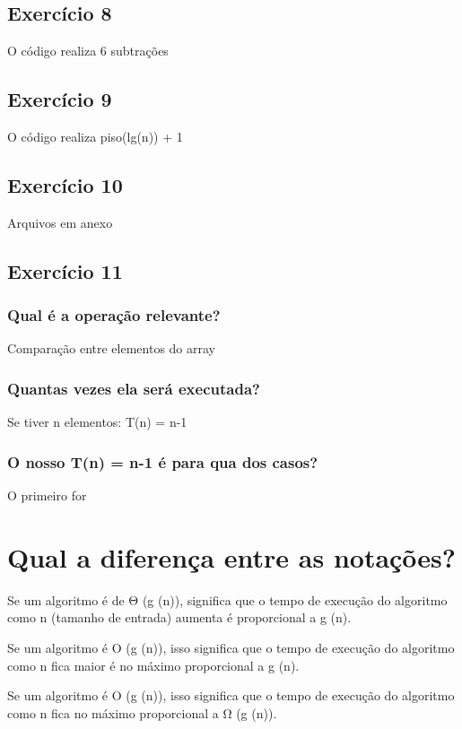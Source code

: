 \documentclass[12pt]{article}
\begin{document}
\subsection{Exercício 8}
O código realiza 6 subtrações
\subsection{Exercício 9}
O código realiza piso(lg(n)) + 1
\subsection{Exercício 10}
Arquivos em anexo
\subsection{Exercício 11}
\subsubsection{Qual é a operação relevante?}
Comparação entre elementos do array
\subsubsection{Quantas vezes ela será executada?}
Se tiver n elementos: T(n) = n-1
\subsubsection{O nosso T(n) = n-1 é para qua dos casos?}
O primeiro for

\section{Qual a diferença entre as notações?}
Se um algoritmo é de Θ (g (n)), significa que o tempo de execução do algoritmo como n 
(tamanho de entrada) aumenta é proporcional a g (n).
\par Se um algoritmo é O (g (n)), isso significa que o tempo de execução do algoritmo como n fica maior é
 no máximo proporcional a g (n).
\par Se um algoritmo é O (g (n)), isso significa que o tempo de execução do algoritmo como n fica
 no máximo proporcional a Ω (g (n)).
\end{document}
